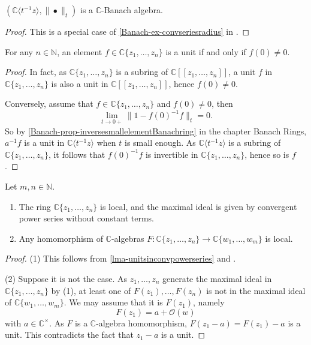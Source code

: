 \begin{proposition}\label{prop-CzztBanachalg}
    $(\mathbb{C}\langle t^{-1}z\rangle ,\|\bullet\|_t)$ is a $\mathbb{C}$-Banach algebra.
\end{proposition}
\begin{proof}
    This is a special case of \cref{Banach-ex-convseriesradius} in 
    .
\end{proof}




\begin{lemma}\label{lma-unitsinconvpowerseries}
    For any $n\in \mathbb{N}$, an element $f\in \mathbb{C}\{ z_1,\ldots,z_n \}$ is a unit if and only if $f(0)\neq 0$.
\end{lemma}
\begin{proof}
    In fact, as $\mathbb{C}\{ z_1,\ldots,z_n \}$ is a subring of $\mathbb{C}[[z_1,\ldots,z_n]]$, a unit $f$ in $\mathbb{C}\{ z_1,\ldots,z_n \}$ is also a unit in $\mathbb{C}[[z_1,\ldots,z_n]]$, hence $f(0)\neq 0$.

    Conversely, assume that $f\in \mathbb{C}\{ z_1,\ldots,z_n \}$ and $f(0)\neq 0$, then
    \[
        \lim_{t\to 0+}\|1-f(0)^{-1}f\|_t=0.
    \]
    So by \cref{Banach-prop-inversesmallelementBanachring} in the chapter Banach Rings, $a^{-1}f$ is a unit in $\mathbb{C}\langle t^{-1}z\rangle$ when $t$ is small enough. As $\mathbb{C}\langle t^{-1}z\rangle$ is a subring of $\mathbb{C}\{ z_1,\ldots,z_n \}$, it follows that $f(0)^{-1}f$ is invertible in $\mathbb{C}\{ z_1,\ldots,z_n \}$, hence so is $f$.
\end{proof}



\begin{thm}\label{thm-converinglocal}
    Let $m, n\in \mathbb{N}$.
\begin{enumerate}
    \item The ring $\mathbb{C}\{ z_1,\ldots,z_n \}$ is local, and the maximal ideal is given by convergent power series without constant terms.
    \item Any homomorphism of $\mathbb{C}$-algebras $F:\mathbb{C}\{ z_1,\ldots,z_n \}\rightarrow \mathbb{C}\{ w_1,\ldots,w_m \}$ is local.
\end{enumerate}


\end{thm}
\begin{proof}
(1) This follows from \cref{lma-unitsinconvpowerseries} and \cite[\href{https://stacks.math.columbia.edu/tag/00E9}{Tag 00E9}]{stacks-project}.

(2) Suppose it is not the case. As $z_1,\ldots,z_n$ generate the maximal ideal in $\mathbb{C}\{ z_1,\ldots,z_n \}$ by (1), at least one of $F(z_1),\ldots,F(z_n)$ is not in the maximal ideal of  $\mathbb{C}\{ w_1,\ldots,w_m \}$. We may assume that it is $F(z_1)$, namely
\[
    F(z_1)=a+\mathcal{O}(w)  
\]
with $a\in \mathbb{C}^{\times}$. As $F$ is a $\mathbb{C}$-algebra homomorphism, $F(z_1-a)=F(z_1)-a$ is a unit. This contradicts the fact that $z_1-a$ is a unit.
\end{proof}




